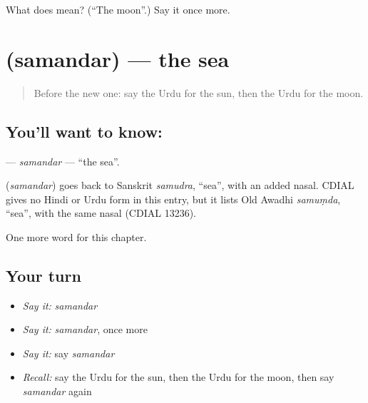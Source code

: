 \begin{tcolorbox}[breakable,colback=teal!4,colframe=teal!35!black,title={Before you move on}]
What does  mean? (\textquotedblleft{}The moon\textquotedblright{}.) Say it once more.
\end{tcolorbox}
\section[\texorpdfstring{\ur{سمندر} (samandar)}{سمندر (samandar)}]{ (samandar) — the sea}

\label{lesson:UR-C66-samandar}



\begin{quote}
Before the new one: say the Urdu for the sun, then the Urdu for the moon.
\end{quote}

\subsection*{You'll want to know: }
\textbf{} — \emph{samandar} — \textquotedblleft{}the sea\textquotedblright{}.

\begin{cousinweb}
\textbf{} (\emph{samandar}) goes back to Sanskrit \emph{samudra}, \textquotedblleft{}sea\textquotedblright{}, with an added nasal. CDIAL gives no Hindi or Urdu form in this entry, but it lists Old Awadhi \emph{samuṃda}, \textquotedblleft{}sea\textquotedblright{}, with the same nasal (CDIAL 13236).
\end{cousinweb}

\begin{grammarlens}[title={What you've built}]
One more word for this chapter.
\end{grammarlens}

\subsection*{Your turn}
\begin{itemize}
\raggedright
  \item \emph{Say it:} \emph{samandar}
  \item \emph{Say it:} \emph{samandar}, once more
  \item \emph{Say it:} say \emph{samandar}
  \item \emph{Recall:} say the Urdu for the sun, then the Urdu for the moon, then say \emph{samandar} again
\end{itemize}

